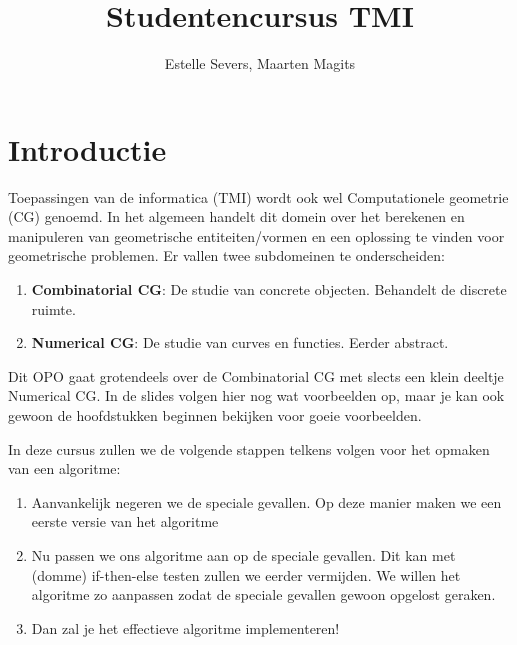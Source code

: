 \documentclass[12pt,a4paper]{article}
\author{Estelle Severs, Maarten Magits}
\title{Studentencursus TMI}
\begin{document}
	\maketitle
	\tableofcontents
	\section{Introductie}
	Toepassingen van de informatica (TMI) wordt ook wel Computationele geometrie (CG) genoemd.
	In het algemeen handelt dit domein over het berekenen en manipuleren van geometrische entiteiten/vormen en een oplossing te vinden voor geometrische problemen.
	Er vallen twee subdomeinen te onderscheiden:
	\begin{enumerate}
		\item \textbf{Combinatorial CG}: De studie van concrete objecten. Behandelt de discrete ruimte.
		\item \textbf{Numerical CG}: De studie van curves en functies. Eerder abstract.
	\end{enumerate}
	Dit OPO gaat grotendeels over de Combinatorial CG met slects een klein deeltje Numerical CG. In de slides volgen hier nog wat voorbeelden op, maar je kan ook gewoon de hoofdstukken beginnen bekijken voor goeie voorbeelden. 
	
	In deze cursus zullen we de volgende stappen telkens volgen voor het opmaken van een algoritme: 
	\begin{enumerate}
		\item Aanvankelijk negeren we de speciale gevallen. Op deze manier maken we een eerste versie van het algoritme
		\item Nu passen we ons algoritme aan op de speciale gevallen. Dit kan met (domme) if-then-else testen zullen we eerder vermijden. We willen het algoritme zo aanpassen zodat de speciale gevallen gewoon opgelost geraken. 
		\item Dan zal je het effectieve algoritme implementeren!
	\end{enumerate}
	
	
\end{document}
